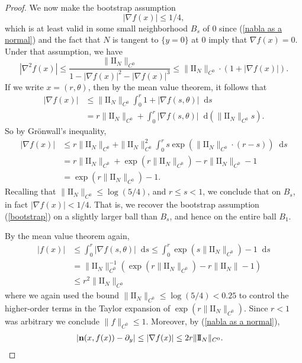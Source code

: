 \documentclass[reqno,11pt]{amsart}
\newcommand*\dif{\mathop{}\!\mathrm{d}}
\newcommand{\Two}{\mathrm{I\!I}}
\newcommand{\normal}{\mathbf n}
\theoremstyle{definition}
\numberwithin{equation}{section}
\begin{document}
\begin{proof}
	We now make the bootstrap assumption
\begin{equation}\label{bootstrap}
	|\nabla f(x)| \leq 1/4,
\end{equation}
	which is at least valid in some small neighborhood $B_s$ of $0$ since (\ref{nabla as a normal}) and the fact that $N$ is tangent to $\{y = 0\}$ at $0$ imply that $\nabla f(x) = 0$. Under that assumption, we have
	$$|\nabla^2 f(x)| \leq \frac{\|\Two_N\|_{C^0}}{1 - |\nabla f(x)|^2 - |\nabla f(x)|^3} \leq \|\Two_N\|_{C^0} \cdot (1 + |\nabla f(x)|).$$
	If we write $x = (r, \theta)$, then by the mean value theorem, it follows that
\begin{align*}
	|\nabla f(x)| &\leq \|\Two_N\|_{C^0} \int_0^r 1 + |\nabla f(s, \theta)| \dif s \\
	&= r\|\Two_N\|_{C^0} + \int_0^r |\nabla f(s, \theta)| \dif(\|\Two_N\|_{C^0} s).
\end{align*}
	So by Gr\"onwall's inequality,
\begin{align*}
	|\nabla f(x)| &\leq r \|\Two_N\|_{C^0} + \|\Two_N\|_{C^0}^2 \int_0^r s \exp(\|\Two_N\|_{C^0} \cdot (r - s)) \dif s \\
	&= r \|\Two_N\|_{C^0} + \exp(r \|\Two_N\|_{C^0}) - r \|\Two_N\|_{C^0} - 1 \\
	&= \exp(r \|\Two_N\|_{C^0}) - 1.
\end{align*}
	Recalling that $\|\Two_N\|_{C^0} \leq \log(5/4)$, and $r \leq s < 1$, we conclude that on $B_s$, in fact $|\nabla f(x)| < 1/4$.
	That is, we recover the bootstrap assumption (\ref{bootstrap}) on a slightly larger ball than $B_s$, and hence on the entire ball $B_1$.

	By the mean value theorem again,
\begin{align*}
	|f(x)| &\leq \int_0^r |\nabla f(s, \theta)| \dif s \leq \int_0^r \exp(s \|\Two_N\|_{C^0}) - 1 \dif s \\
	&= \|\Two_N\|_{C^0}^{-1} (\exp(r \|\Two_N\|_{C^0}) - r\|\Two_N\| - 1) \\
	&\leq r^2 \|\Two_N\|_{C^0}
\end{align*}
	where we again used the bound $\|\Two_N\|_{C^0} \leq \log(5/4) < 0.25$ to control the higher-order terms in the Taylor expansion of $\exp(r \|\Two_N\|_{C^0})$. Since $r < 1$ was arbitrary we conclude $\|f\|_{C^0} \leq 1$. Moreover, by (\ref{nabla as a normal}),
\begin{align*}
	|\normal(x, f(x)) - \partial_y| &\leq |\nabla f(x)| \leq 2r \|\Two_N\|_{C^0}. \qedhere
\end{align*}
\end{proof}
\end{document}
